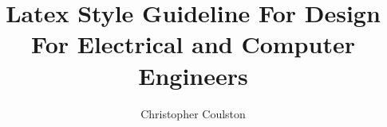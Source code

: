 \documentclass[letterpaper, 10pt]{memoir}
\begin{document}
\frontmatter
\title{Latex Style Guideline For Design For Electrical and Computer Engineers} 
\author{Christopher Coulston}
\date{}

\maketitle

\tableofcontents

\mainmatter 


\hideanswers


\printindex
\end{document}
